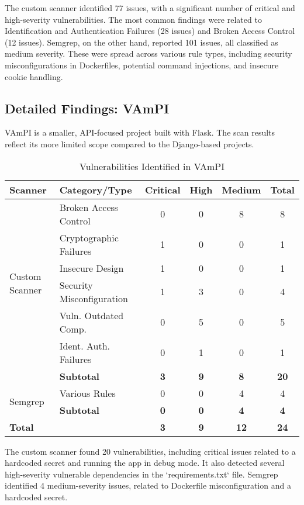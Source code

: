 The custom scanner identified 77 issues, with a significant number of critical and high-severity vulnerabilities. The most common findings were related to Identification and Authentication Failures (28 issues) and Broken Access Control (12 issues). Semgrep, on the other hand, reported 101 issues, all classified as medium severity. These were spread across various rule types, including security misconfigurations in Dockerfiles, potential command injections, and insecure cookie handling.

\subsection{Detailed Findings: VAmPI}

VAmPI is a smaller, API-focused project built with Flask. The scan results reflect its more limited scope compared to the Django-based projects.

\begin{table}[h!]
\centering
\caption{Vulnerabilities Identified in VAmPI}
\label{tab:vampi_vulns}
\begin{tabular}{|l|l|c|c|c|c|}
\hline
\textbf{Scanner} & \textbf{Category/Type} & \textbf{Critical} & \textbf{High} & \textbf{Medium} & \textbf{Total} \\
\hline
\multirow{6}{*}{Custom Scanner} & Broken Access Control & 0 & 0 & 8 & 8 \\
& Cryptographic Failures & 1 & 0 & 0 & 1 \\
& Insecure Design & 1 & 0 & 0 & 1 \\
& Security Misconfiguration & 1 & 3 & 0 & 4 \\
& Vuln. Outdated Comp. & 0 & 5 & 0 & 5 \\
& Ident. Auth. Failures & 0 & 1 & 0 & 1 \\
\cline{2-6}
& \textbf{Subtotal} & \textbf{3} & \textbf{9} & \textbf{8} & \textbf{20} \\
\hline
\multirow{2}{*}{Semgrep} & Various Rules & 0 & 0 & 4 & 4 \\
\cline{2-6}
& \textbf{Subtotal} & \textbf{0} & \textbf{0} & \textbf{4} & \textbf{4} \\
\hline
\multicolumn{2}{|l|}{\textbf{Total}} & \textbf{3} & \textbf{9} & \textbf{12} & \textbf{24} \\
\hline
\end{tabular}
\end{table}

The custom scanner found 20 vulnerabilities, including critical issues related to a hardcoded secret and running the app in debug mode. It also detected several high-severity vulnerable dependencies in the `requirements.txt` file. Semgrep identified 4 medium-severity issues, related to Dockerfile misconfiguration and a hardcoded secret.

